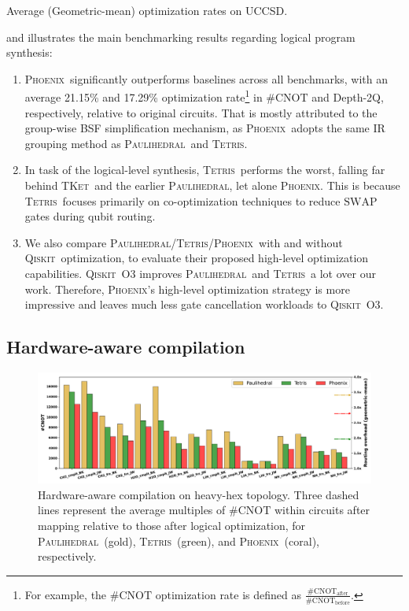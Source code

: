 \documentclass[conference]{IEEEtran}
\newcommand{\phoenix}{\textsc{Phoenix}}
\newcommand{\qiskit}{\textsc{Qiskit}}
\newcommand{\tket}{\textsc{TKet}}
\newcommand{\tetris}{\textsc{Tetris}}
\newcommand{\paulihedral}{\textsc{Paulihedral}}
\newcommand{\SWAP}{\mathrm{SWAP}}
\newcommand{\CNOT}{\mathrm{CNOT}}
\begin{document}
    \begin{table}[tbp]
        \centering
        \caption{Average (Geometric-mean) optimization rates on UCCSD.}
        \scalebox{0.95}{
                        
        }
        \label{tab:uccsd-avg}        
    \end{table}

     and  illustrates the main benchmarking results regarding logical program synthesis:
    \begin{enumerate}
        \item \phoenix\ significantly outperforms baselines across all benchmarks, with an average 21.15\% and 17.29\% optimization rate\footnote{For example, the \#$ \CNOT $ optimization rate is defined as $\frac{\#\CNOT_\textrm{after}}{\#\CNOT_\textrm{before}}$.} in \#$ \CNOT $ and Depth-2Q, respectively, relative to original circuits. That is mostly attributed to the group-wise BSF simplification mechanism, as \phoenix\ adopts the same IR grouping method as \paulihedral\ and \tetris.
        \item In task of the logical-level synthesis, \tetris\ performs the worst, falling far behind \tket\ and the earlier \paulihedral, let alone \phoenix. This is because \tetris\ focuses primarily on co-optimization techniques to reduce $\SWAP$ gates during qubit routing.
        \item We also compare \paulihedral/\tetris/\phoenix\ with and without \qiskit\ optimization, to evaluate their proposed high-level optimization capabilities. \qiskit\ O3 improves \paulihedral\ and \tetris\ a lot over our work. Therefore, \phoenix's high-level optimization strategy is more impressive and leaves much less gate cancellation workloads to \qiskit\ O3.
    \end{enumerate}


\subsection{Hardware-aware compilation}

    \begin{figure}[tbp]
        \centering
        \includegraphics[width=\columnwidth]{figures/num_2q_gates_manhattan.pdf}
        \caption{Hardware-aware compilation on heavy-hex topology. Three dashed lines represent the average multiples of \#$\CNOT$ within circuits after mapping relative to those after logical optimization, for \paulihedral\ (gold), \tetris\ (green), and \phoenix\ (coral), respectively.}
        \label{fig:manhattan}
    \end{figure}
\end{document}
